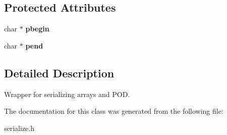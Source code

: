 \subsection*{Protected Attributes}
\begin{DoxyCompactItemize}
\item 
\mbox{\label{class_c_flat_data_ad5f93a9d4e1cc71eb5fc94e9c9d4d89d}} 
char $\ast$ {\bfseries pbegin}
\item 
\mbox{\label{class_c_flat_data_add53aa6440254a30392bcf660f3f8057}} 
char $\ast$ {\bfseries pend}
\end{DoxyCompactItemize}


\subsection{Detailed Description}
Wrapper for serializing arrays and P\+OD. 

The documentation for this class was generated from the following file\+:\begin{DoxyCompactItemize}
\item 
serialize.\+h\end{DoxyCompactItemize}
